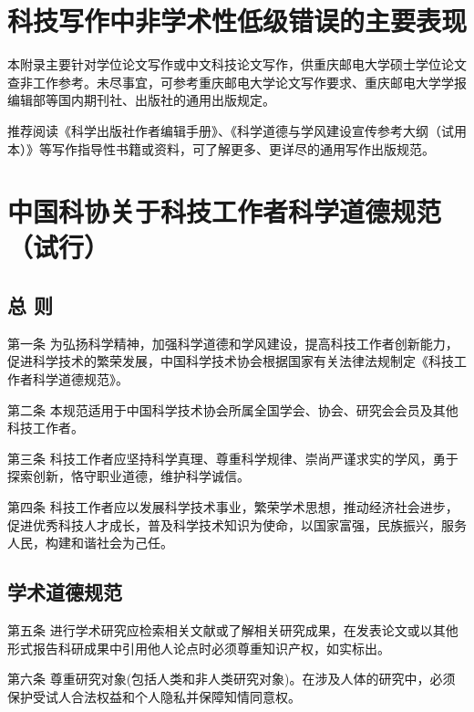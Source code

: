 \documentclass{cqupt_thesis}
\begin{document}
    \begin{reference}
        
    \end{reference}


    \beginappendix


    \chapter{科技写作中非学术性低级错误的主要表现}

    本附录主要针对学位论文写作或中文科技论文写作，供重庆邮电大学硕士学位论文查非工作参考。未尽事宜，可参考重庆邮电大学论文写作要求、重庆邮电大学学报编辑部等国内期刊社、出版社的通用出版规定。

    推荐阅读《科学出版社作者编辑手册》、《科学道德与学风建设宣传参考大纲（试用本）》等写作指导性书籍或资料，可了解更多、更详尽的通用写作出版规范。


    \chapter{中国科协关于科技工作者科学道德规范（试行）}


    \section{总 则}
    第一条 为弘扬科学精神，加强科学道德和学风建设，提高科技工作者创新能力，促进科学技术的繁荣发展，中国科学技术协会根据国家有关法律法规制定《科技工作者科学道德规范》。

    第二条 本规范适用于中国科学技术协会所属全国学会、协会、研究会会员及其他科技工作者。

    第三条 科技工作者应坚持科学真理、尊重科学规律、崇尚严谨求实的学风，勇于探索创新，恪守职业道德，维护科学诚信。

    第四条 科技工作者应以发展科学技术事业，繁荣学术思想，推动经济社会进步，促进优秀科技人才成长，普及科学技术知识为使命，以国家富强，民族振兴，服务人民，构建和谐社会为己任。


    \section{学术道德规范}

    第五条 进行学术研究应检索相关文献或了解相关研究成果，在发表论文或以其他形式报告科研成果中引用他人论点时必须尊重知识产权，如实标出。

    第六条 尊重研究对象(包括人类和非人类研究对象)。在涉及人体的研究中，必须保护受试人合法权益和个人隐私并保障知情同意权。
\end{document}
